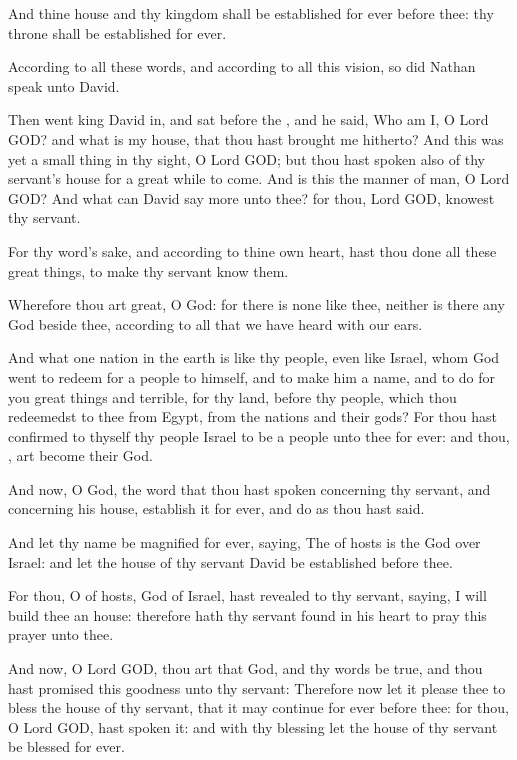 \Verse And thine house and thy kingdom shall be established for ever before thee: thy throne shall be established for ever.

\Verse According to all these words, and according to all this vision, so did Nathan speak unto David.

\Verse Then went king David in, and sat before the \LORD, and he said, Who am I, O Lord GOD? and what is my house, that thou hast brought me hitherto?  \Verse And this was yet a small thing in thy sight, O Lord GOD; but thou hast spoken also of thy servant's house for a great while to come. And is this the manner of man, O Lord GOD?  \Verse And what can David say more unto thee? for thou, Lord GOD, knowest thy servant.

\Verse For thy word's sake, and according to thine own heart, hast thou done all these great things, to make thy servant know them.

\Verse Wherefore thou art great, O \LORD God: for there is none like thee, neither is there any God beside thee, according to all that we have heard with our ears.

\Verse And what one nation in the earth is like thy people, even like Israel, whom God went to redeem for a people to himself, and to make him a name, and to do for you great things and terrible, for thy land, before thy people, which thou redeemedst to thee from Egypt, from the nations and their gods?  \Verse For thou hast confirmed to thyself thy people Israel to be a people unto thee for ever: and thou, \LORD, art become their God.

\Verse And now, O \LORD God, the word that thou hast spoken concerning thy servant, and concerning his house, establish it for ever, and do as thou hast said.

\Verse And let thy name be magnified for ever, saying, The \LORD of hosts is the God over Israel: and let the house of thy servant David be established before thee.

\Verse For thou, O \LORD of hosts, God of Israel, hast revealed to thy servant, saying, I will build thee an house: therefore hath thy servant found in his heart to pray this prayer unto thee.

\Verse And now, O Lord GOD, thou art that God, and thy words be true, and thou hast promised this goodness unto thy servant: \Verse Therefore now let it please thee to bless the house of thy servant, that it may continue for ever before thee: for thou, O Lord GOD, hast spoken it: and with thy blessing let the house of thy servant be blessed for ever.


